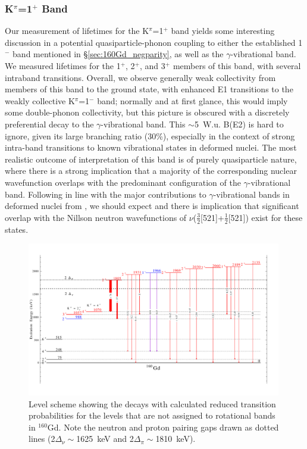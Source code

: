 \subsubsection{K$^\pi$=1$^+$ Band}
Our measurement of lifetimes for the K$^\pi$=1$^+$ band yields some interesting discussion in a potential quasiparticle-phonon coupling to either the established 1$^-$ band mentioned in \S \ref{sec:160Gd_negparity}, as well as the $\gamma$-vibrational band. We measured lifetimes for the 1$^+$, 2$^+$, and 3$^+$ members of this band, with several intraband transitions. Overall, we observe generally weak collectivity from members of this band to the ground state, with enhanced E1 transitions to the weakly collective K$^\pi$=1$^-$ band; normally and at first glance, this would imply some double-phonon collectivity, but this picture is obscured with a discretely preferential decay to the $\gamma$-vibrational band. This $\sim$5~W.u. B(E2) is hard to ignore, given its large branching ratio (30\%), especially in the context of strong intra-band transitions to known vibrational states in deformed nuclei. The most realistic outcome of interpretation of this band is of purely quasiparticle nature, where there is a strong implication that a majority of the corresponding nuclear wavefunction overlaps with the predominant configuration of the $\gamma$-vibrational band. Following in line with the major contributions to $\gamma$-vibrational bands in deformed nuclei from \cite{Casten_text}, we should expect and there is implication that significant overlap with the Nillson neutron wavefunctions of $\nu$($\frac{3}{2}$[521]+$\frac{1}{2}$[521]) exist for these states.


\begin{center}
\begin{figure}[h!]
\includegraphics[width=0.99\textwidth]{figures/160Gd_Kunknown.pdf}
\caption{Level scheme showing the decays with calculated reduced transition probabilities for the levels that are not assigned to rotational bands in $^{160}$Gd. Note the neutron and proton pairing gaps drawn as dotted lines (2$\Delta_\nu\sim$1625~keV and 2$\Delta_\pi\sim$1810~keV). \label{fig:160Gd_Kunknown}}
\end{figure}
\end{center}

